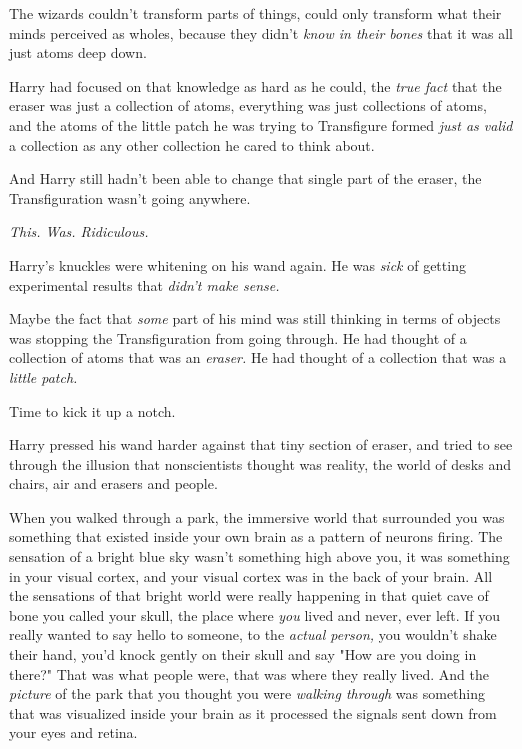 The wizards couldn't transform parts of things, could only transform what their 
minds perceived as wholes, because they didn't \emph{know in their bones} that 
it was all just atoms deep down.

Harry had focused on that knowledge as hard as he could, the \emph{true fact} 
that the eraser was just a collection of atoms, everything was just collections 
of atoms, and the atoms of the little patch he was trying to Transfigure formed 
\emph{just as valid} a collection as any other collection he cared to think 
about.

And Harry still hadn't been able to change that single part of the eraser, the 
Transfiguration wasn't going anywhere.

\emph{This. Was. Ridiculous.}

Harry's knuckles were whitening on his wand again. He was \emph{sick} of 
getting experimental results that \emph{didn't make sense.}

Maybe the fact that \emph{some} part of his mind was still thinking in terms of 
objects was stopping the Transfiguration from going through. He had thought of 
a collection of atoms that was an \emph{eraser.} He had thought of a collection 
that was a \emph{little patch.}

Time to kick it up a notch.

Harry pressed his wand harder against that tiny section of eraser, and tried to 
see through the illusion that nonscientists thought was reality, the world of 
desks and chairs, air and erasers and people.

When you walked through a park, the immersive world that surrounded you was 
something that existed inside your own brain as a pattern of neurons firing. 
The sensation of a bright blue sky wasn't something high above you, it was 
something in your visual cortex, and your visual cortex was in the back of your 
brain. All the sensations of that bright world were really happening in that 
quiet cave of bone you called your skull, the place where \emph{you} lived and 
never, ever left. If you really wanted to say hello to someone, to the 
\emph{actual person,} you wouldn't shake their hand, you'd knock gently on 
their skull and say "How are you doing in there?" That was what people were, 
that was where they really lived. And the \emph{picture} of the park that you 
thought you were \emph{walking through} was something that was visualized 
inside your brain as it processed the signals sent down from your eyes and 
retina.

